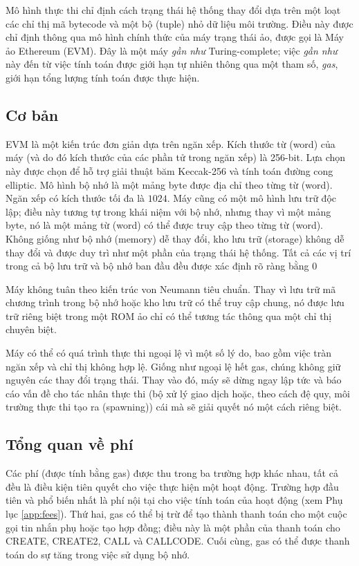 \documentclass[9pt,oneside]{amsart}
\begin{document}
\begin{multicols}{2}
Mô hình thực thi chỉ định cách trạng thái hệ thống thay đổi dựa trên một loạt các chỉ thị mã bytecode và một bộ (tuple) nhỏ dữ liệu môi trường. Điều này được chỉ định thông qua mô hình chính thức của máy trạng thái ảo, được gọi là Máy ảo Ethereum (EVM). Đây là một máy \textit{gần như} Turing-complete; việc \textit{gần như} này đến từ việc tính toán được giới hạn tự nhiên thông qua một tham số, \textit{gas}, giới hạn tổng lượng tính toán được thực hiện.

\subsection{Cơ bản}

EVM là một kiến trúc đơn giản dựa trên ngăn xếp. Kích thước từ (word) của máy (và do đó kích thước của các phần tử trong ngăn xếp) là 256-bit. Lựa chọn này được chọn để hỗ trợ giải thuật băm Keccak-256 và tính toán đường cong elliptic. Mô hình bộ nhớ là một mảng byte được địa chỉ theo từng từ (word). Ngăn xếp có kích thước tối đa là $1024$. Máy cũng có một mô hình lưu trữ độc lập; điều này tương tự trong khái niệm với bộ nhớ, nhưng thay vì một mảng byte, nó là một mảng từ (word) có thể được truy cập theo từng từ (word). Không giống như bộ nhớ (memory) dễ thay đổi, kho lưu trữ (storage) không dễ thay đổi và được duy trì như một phần của trạng thái hệ thống. Tất cả các vị trí trong cả bộ lưu trữ và bộ nhớ ban đầu đều được xác định rõ ràng bằng 0

Máy không tuân theo kiến trúc von Neumann tiêu chuẩn. Thay vì lưu trữ mã chương trình trong bộ nhớ hoặc kho lưu trữ có thể truy cập chung, nó được lưu trữ riêng biệt trong một ROM ảo chỉ có thể tương tác thông qua một chỉ thị chuyên biệt.

Máy có thể có quá trình thực thi ngoại lệ vì một số lý do, bao gồm việc tràn ngăn xếp và chỉ thị không hợp lệ. Giống như ngoại lệ hết gas, chúng không giữ nguyên các thay đổi trạng thái. Thay vào đó, máy sẽ dừng ngay lập tức và báo cáo vấn đề cho tác nhân thực thi (bộ xử lý giao dịch hoặc, theo cách đệ quy, môi trường thực thi tạo ra (spawning)) cái mà sẽ giải quyết nó một cách riêng biệt.

\subsection{Tổng quan về phí}

Các phí (được tính bằng gas) được thu trong ba trường hợp khác nhau, tất cả đều là điều kiện tiên quyết cho việc thực hiện một hoạt động. Trường hợp đầu tiên và phổ biến nhất là phí nội tại cho việc tính toán của hoạt động (xem Phụ lục \ref{app:fees}). Thứ hai, gas có thể bị trừ để tạo thành thanh toán cho một cuộc gọi tin nhắn phụ hoặc tạo hợp đồng; điều này là một phần của thanh toán cho {\small CREATE}, {\small CREATE2}, {\small CALL} và {\small CALLCODE}. Cuối cùng, gas có thể được thanh toán do sự tăng trong việc sử dụng bộ nhớ.


\end{multicols}
\end{document}

